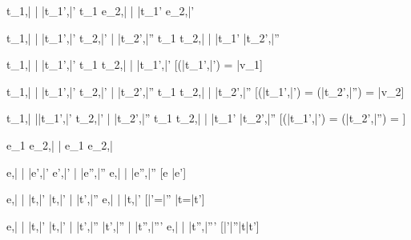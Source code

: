   {t_1,\bar{\sigma} \bar{\stride} \bar{t_1'},\bar{\sigma'}}
  {t_1 \Next e_2,\bar{\sigma} \bar{\stride} \bar{t_1'} \Next e_2,\bar{\sigma'}}


  {t_1,\bar{\sigma}  \bar{\stride} \bar{t_1'},\bar{\sigma'}  \Quad
   t_2,\bar{\sigma'} \bar{\stride} \bar{t_2'},\bar{\sigma''}}
  {t_1 \And t_2,\bar{\sigma} \bar{\stride} \bar{t_1'} \And \bar{t_2'},\bar{\sigma''}}


  {t_1,\bar{\sigma}  \bar{\stride} \bar{t_1'},\bar{\sigma'}}
  {t_1 \Or t_2,\bar{\sigma} \bar{\stride} \bar{t_1'},\bar{\sigma'}}
  [\Value(\bar{t_1'},\bar{\sigma'}) = \bar{v_1}]

  {t_1,\bar{\sigma}  \bar{\stride} \bar{t_1'},\bar{\sigma'}  \Quad
   t_2,\bar{\sigma'} \bar{\stride} \bar{t_2'},\bar{\sigma''}}
  {t_1 \Or t_2,\bar{\sigma} \bar{\stride} \bar{t_2'},\bar{\sigma''}}
  [\Value(\bar{t_1'},\bar{\sigma'}) = \bot \land \Value(\bar{t_2'},\bar{\sigma''}) = \bar{v_2}]

  {t_1,\bar{\sigma}  \bar{\stride }\bar{t_1'},\bar{\sigma'}  \Quad
   t_2,\bar{\sigma' }\bar{\stride} \bar{t_2'},\bar{\sigma''}}
  {t_1 \Or t_2,\bar{\sigma} \bar{\stride} \bar{t_1'} \Or \bar{t_2'},\bar{\sigma''}}
  [\Value(\bar{t_1'},\bar{\sigma'}) = \bot \land \Value(\bar{t_2'},\bar{\sigma''}) = \bot]


  { }
  {e_1 \Xor e_2,\bar{\sigma} \bar{\stride} e_1 \Xor e_2,\bar{\sigma}}

    {e,\bar{\sigma} \bar{\eval} \bar{e'},\bar{\sigma'}  \Quad
     e',\bar{\sigma'} \bar{\stride} \bar{e''},\bar{\sigma''}}
    {e,\bar{\sigma} \bar{\stride} \bar{e''},\bar{\sigma''}}
    [e \neq \bar{e'}]


    {e,\bar{\sigma} \bar{\eval} \bar{t},\bar{\sigma'} \Quad
     \bar{t},\bar{\sigma'} \bar{\stride} \bar{t'},\bar{\sigma''}}
    {e,\bar{\sigma} \bar{\normalise} \bar{t},\bar{\sigma'}}
    [\bar{\sigma'}=\bar{\sigma''} \land \bar{t}=\bar{t'}]

    {e,\bar{\sigma} \bar{\eval} \bar{t},\bar{\sigma'}  \Quad
     \bar{t},\bar{\sigma'} \bar{\stride} \bar{t'},\bar{\sigma''}  \Quad
     \bar{t'},\bar{\sigma''} \bar{\normalise} \bar{t''},\bar{\sigma'''}}
    {e,\bar{\sigma} \bar{\normalise} \bar{t''},\bar{\sigma'''}}
    [\bar{\sigma'}\neq \bar{\sigma''}\vee \bar{t}\neq \bar{t'}]



